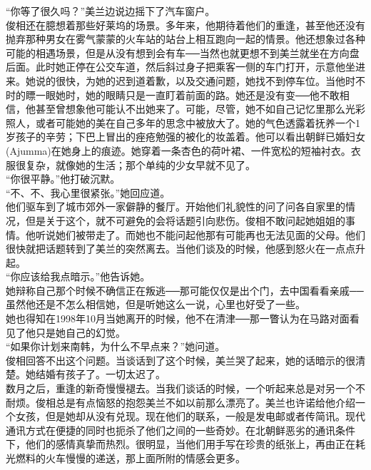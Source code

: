 “你等了很久吗？”美兰边说边摇下了汽车窗户。\\

俊相还在臆想着那些好莱坞的场景。多年来，他期待着他们的重逢，甚至他还没有抛弃那种男女在雾气蒙蒙的火车站的站台上相互跑向一起的情景。他还想象过各种可能的相遇场景，但是从没有想到会有车──当然也就更想不到美兰就坐在方向盘后面。此时她正停在公交车道，然后斜过身子把乘客一侧的车门打开，示意他坐进来。她说的很快，为她的迟到道着歉，以及交通问题，她找不到停车位。当他时不时的瞟一眼她时，她的眼睛只是一直盯着前面的路。她还是没有变──他不敢相信，他甚至曾想象他可能认不出她来了。可能，尽管，她不如自己记忆里那么光彩照人，或者可能她的美在自己多年的思念中被放大了。她的气色透露着抚养一个1岁孩子的辛劳；下巴上冒出的痤疮勉强的被化的妆盖着。他可以看出朝鲜已婚妇女(Ajumma)在她身上的痕迹。她穿着一条杏色的荷叶裙、一件宽松的短袖衬衣。衣服很复杂，就像她的生活；那个单纯的少女早就不见了。\\

“你很平静。”他打破沉默。\\

“不、不、我心里很紧张。”她回应道。\\

他们驱车到了城市郊外一家僻静的餐厅。开始他们礼貌性的问了问各自家里的情况，但是关于这个，就不可避免的会将话题引向悲伤。俊相不敢问起她姐姐的事情。他听说她们被带走了。而她也不能问起他那有可能再也无法见面的父母。他们很快就把话题转到了美兰的突然离去。当他们谈及的时候，他感到怒火在一点点升起。\\

“你应该给我点暗示。”他告诉她。\\

她辩称自己那个时候不确信正在叛逃──那可能仅仅是出个门，去中国看看亲戚──虽然他还是不怎么相信她，但是听她这么一说，心里也好受了一些。\\

她也得知在1998年10月当她离开的时候，他不在清津──那一瞥认为在马路对面看见了他只是她自己的幻觉。\\

“如果你计划来南韩，为什么不早点来？”她问道。\\

俊相回答不出这个问题。当谈话到了这个时候，美兰哭了起来，她的话暗示的很清楚。她结婚有孩子了。一切太迟了。\\

数月之后，重逢的新奇慢慢褪去。当我们谈话的时候，一个听起来总是对另一个不耐烦。俊相总是有点恼怒的抱怨美兰不如以前那么漂亮了。美兰也许诺给他介绍一个女孩，但是她却从没有兑现。现在他们的联系，一般是发电邮或者传简讯。现代通讯方式在便捷的同时也扼杀了他们之间的一些奇妙。在北朝鲜恶劣的通讯条件下，他们的感情真挚而热烈。很明显，当他们用手写在珍贵的纸张上，再由正在耗光燃料的火车慢慢的递送，那上面所附的情感会更多。\\

